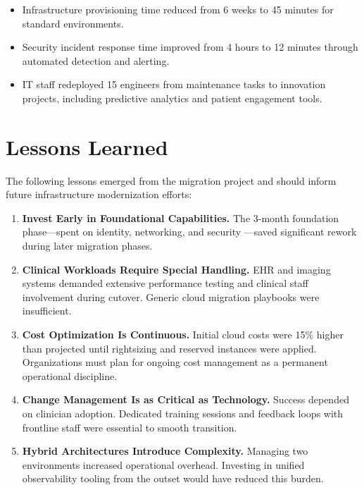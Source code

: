 \documentclass[
    language=english,
    doctype=article,
    institution=none,
]{../../omnilatex}
\begin{document}
\begin{itemize}
    \item Infrastructure provisioning time reduced from 6 weeks to 45
        minutes for standard environments.
    \item Security incident response time improved from 4 hours to 12
        minutes through automated detection and alerting.
    \item IT staff redeployed 15 engineers from maintenance tasks to
        innovation projects, including predictive analytics and patient
        engagement tools.
\end{itemize}

\section{Lessons Learned}

The following lessons emerged from the migration project and should inform
future infrastructure modernization efforts:

\begin{enumerate}
    \item \textbf{Invest Early in Foundational Capabilities.} The 3-month
        foundation phase---spent on identity, networking, and security
        ---saved significant rework during later migration phases.
    \item \textbf{Clinical Workloads Require Special Handling.} EHR and
        imaging systems demanded extensive performance testing and
        clinical staff involvement during cutover. Generic cloud migration
        playbooks were insufficient.
    \item \textbf{Cost Optimization Is Continuous.} Initial cloud costs
        were 15\% higher than projected until rightsizing and reserved
        instances were applied. Organizations must plan for ongoing cost
        management as a permanent operational discipline.
    \item \textbf{Change Management Is as Critical as Technology.} Success
        depended on clinician adoption. Dedicated training sessions and
        feedback loops with frontline staff were essential to smooth
        transition.
    \item \textbf{Hybrid Architectures Introduce Complexity.} Managing
        two environments increased operational overhead. Investing in
        unified observability tooling from the outset would have reduced
        this burden.
\end{enumerate}

\printbibliography[heading=none]
\end{document}
